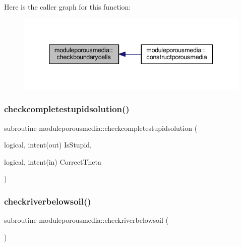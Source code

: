 Here is the caller graph for this function\+:\nopagebreak
\begin{figure}[H]
\begin{center}
\leavevmode
\includegraphics[width=339pt]{namespacemoduleporousmedia_a2dddd8490c583823d5dd45c3bb20e816_icgraph}
\end{center}
\end{figure}
\mbox{\label{namespacemoduleporousmedia_ae17de838533d1f706a81845e023fcec8}} 
\subsubsection{\texorpdfstring{checkcompletestupidsolution()}{checkcompletestupidsolution()}}
{\footnotesize\ttfamily subroutine moduleporousmedia\+::checkcompletestupidsolution (\begin{DoxyParamCaption}\item[{logical, intent(out)}]{Is\+Stupid,  }\item[{logical, intent(in)}]{Correct\+Theta }\end{DoxyParamCaption})\hspace{0.3cm}{\ttfamily [private]}}

\mbox{\label{namespacemoduleporousmedia_a3f2cef78b695643e2f4662105678330c}} 
\subsubsection{\texorpdfstring{checkriverbelowsoil()}{checkriverbelowsoil()}}
{\footnotesize\ttfamily subroutine moduleporousmedia\+::checkriverbelowsoil (\begin{DoxyParamCaption}{ }\end{DoxyParamCaption})\hspace{0.3cm}{\ttfamily [private]}}


